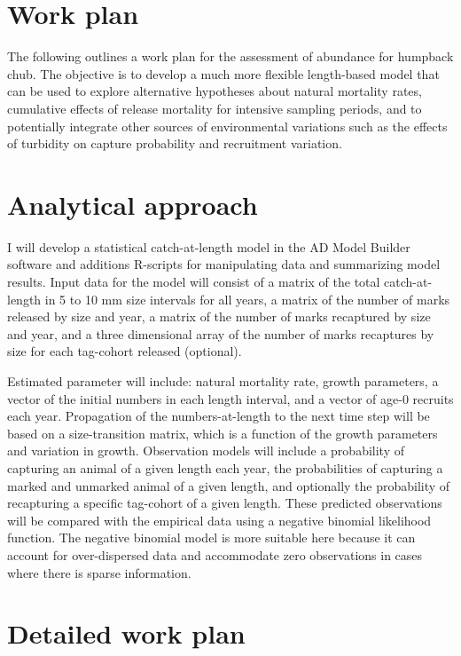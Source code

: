 
\section{Work plan}
The following outlines a work plan for the assessment of abundance for humpback chub. The objective is to develop a much more flexible length-based model that can be used to explore alternative hypotheses about natural mortality rates, cumulative effects of release mortality for intensive sampling periods, and to potentially integrate other sources of environmental variations such as the effects of turbidity on capture probability and recruitment variation.

\section*{Analytical approach}
I will develop a statistical catch-at-length model in the AD Model Builder software and additions R-scripts for manipulating data and summarizing model results.  Input data for the model will consist of a matrix of the total catch-at-length in 5 to 10 mm size intervals for all years, a matrix of the number of marks released by size and year, a matrix of the number of marks recaptured by size and year, and a three dimensional array of the number of marks recaptures by size for each tag-cohort released (optional).

Estimated parameter will include: natural mortality rate, growth parameters, a vector of the initial numbers in each length interval, and a vector of age-0 recruits each year.  Propagation of the numbers-at-length to the next time step will be based on a size-transition matrix, which is a function of the growth parameters and variation in growth.  Observation models will include a probability of capturing an animal of a given length each year, the probabilities of capturing a marked and unmarked animal of a given length, and optionally the probability of recapturing a specific tag-cohort of a given length.  These predicted observations will be compared with the empirical data using a negative binomial likelihood function.  The negative binomial model is more suitable here because it can account for over-dispersed data  and accommodate zero observations in cases where there is sparse information.

\section*{Detailed work plan}

